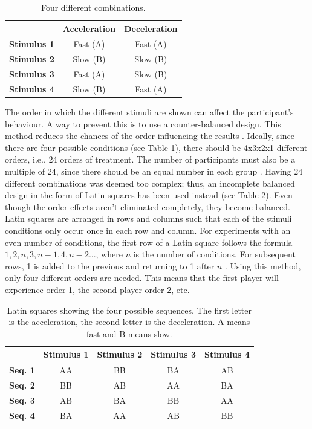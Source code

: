 \begin{table} \centering
\caption{Four different combinations.}
\label{tab:combinations}
\begin{tabular}{ccc}
\toprule
& \textbf{Acceleration} & \textbf{Deceleration} \\
\midrule
\textbf{Stimulus 1} & Fast (A) & Fast (A)\\
\textbf{Stimulus 2} & Slow (B) & Slow (B)\\
\textbf{Stimulus 3} & Fast (A) & Slow (B)\\
\textbf{Stimulus 4} & Slow (B) & Fast (A)\\
\bottomrule
\end{tabular}
\end{table}

The order in which the different stimuli are shown can affect the participant's behaviour.  A way to prevent this is to use a counter-balanced design. This method reduces the chances of the order influencing the results \cite{experimental2}. Ideally, since there are four possible conditions (see Table \ref{tab:combinations}), there should be 4x3x2x1 different orders, i.e., 24 orders of treatment. The number of participants must also be a multiple of 24, since there should be an equal number in each group \cite{experimental2}. Having 24 different combinations was deemed too complex; thus, an incomplete balanced design in the form of Latin squares has been used instead (see Table \ref{table:latin}). Even though the order effects aren't eliminated completely, they become balanced. Latin squares are arranged in rows and columns such that each of the stimuli conditions only occur once in each row and column. For experiments with an even number of conditions, the first row of a Latin square follows the formula $1, 2, n, 3, n-1, 4, n-2...$, where $n$ is the number of conditions. For subsequent rows, 1 is added to the previous and returning to 1 after $n$ \cite{experimental2}. Using this method, only four different orders are needed. This means that the first player will experience order 1, the second player order 2, etc.

\begin{table} \centering
\scriptsize
\caption{Latin squares showing the four possible sequences. The first letter is the acceleration, the second letter is the deceleration. A means fast and B means slow.}
\label{table:latin}
\begin{tabular}{ccccc}
\toprule
& \textbf{Stimulus 1} & \textbf{Stimulus 2} & \textbf{Stimulus 3} & \textbf{Stimulus 4}\\
\midrule
\textbf{Seq. 1} & AA & BB & BA & AB\\
\textbf{Seq. 2} & BB & AB & AA & BA\\
\textbf{Seq. 3} & AB & BA & BB & AA\\
\textbf{Seq. 4} & BA & AA & AB & BB\\
\bottomrule
\end{tabular}
\end{table}

